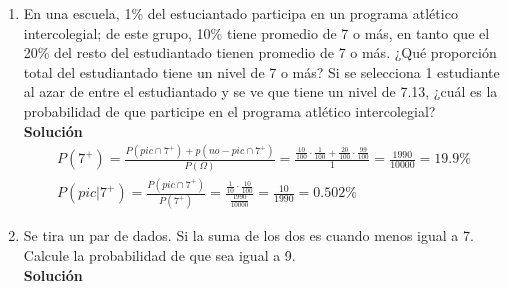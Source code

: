 \begin{enumerate}
    \item En una escuela, 1\% del estuciantado participa en un programa atlético intercolegial; de este grupo, 10\% tiene promedio de 7 o más, en tanto que el 20\% del resto del estudiantado tienen promedio de 7 o más. ¿Qué proporción total del estudiantado tiene un nivel de 7 o más? Si se selecciona 1 estudiante al azar de entre el estudiantado y se ve que tiene un nivel de 7.13, ¿cuál es la probabilidad de que participe en el programa atlético intercolegial?
    \\\textbf{Solución}
    \begin{gather*}
    P(7^+) = \frac{P(pic \cap 7^+) + p(no-pic \cap 7^+)}{P(\Omega)} = \frac{\frac{10}{100} \cdot \frac{1}{100} + \frac{20}{100} \cdot \frac{99}{100}}{1} = \frac{1990}{10000} = 19.9\% \\
    P(pic | 7^+) = \frac{P(pic \cap 7^+)}{P(7^+)} = \frac{\frac{1}{10} \cdot \frac{10}{100}}{\frac{1990}{10000}} = \frac{10}{1990} = 0.502\%
    \end{gather*}
    \item Se tira un par de dados. Si la suma de los dos es cuando menos igual a 7. Calcule la probabilidad de que sea igual a 9.
    \\\textbf{Solución}
    

\end{enumerate}
